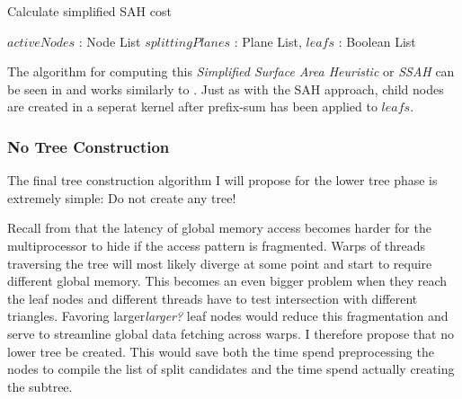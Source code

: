 \begin{algorithm}
  \caption{Calculate simplified SAH cost}
  \label{alg:calcBalancedCost}
  \begin{algorithmic}
              {$activeNodes$ : Node List}
              {$splittingPlanes$ : Plane List, $leafs$ : Boolean List}{
                  \ENDFOR
                \ENDFOR
              }
  \end{algorithmic}
\end{algorithm}


The algorithm for computing this \textit{Simplified Surface Area Heuristic} or
\textit{SSAH} can be seen in  and works similarly
to . Just as with the SAH approach, child nodes are
created in a seperat kernel after prefix-sum has been applied to $leafs$.

\subsubsection{No Tree Construction}

The final tree construction algorithm I will propose for the lower tree phase is
extremely simple: Do not create any tree!

Recall from  that the latency of global memory
access becomes harder for the multiprocessor to hide if the access pattern is
fragmented. Warps of threads traversing the tree will most likely diverge at
some point and start to require different global memory. This becomes an even
bigger problem when they reach the leaf nodes and different threads have to test
intersection with different triangles. Favoring larger\textit{larger?} leaf
nodes would reduce this fragmentation and serve to streamline global data
fetching across warps. I therefore propose that no lower tree be created. This
would save both the time spend preprocessing the nodes to compile the list of
split candidates and the time spend actually creating the subtree.



